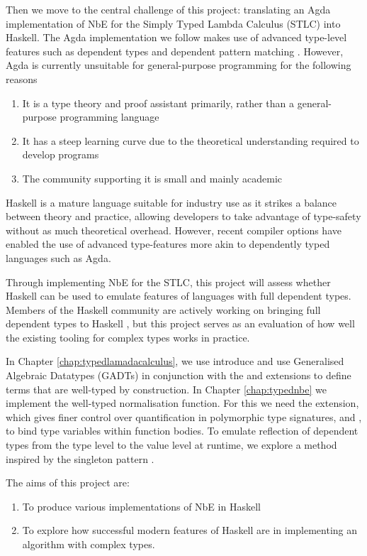 Then we move to the central challenge of this project: translating an Agda implementation of NbE for the Simply Typed Lambda Calculus (STLC) into Haskell. The Agda implementation we follow makes use of advanced type-level features such as dependent types and dependent pattern matching \cite{agdaUserGuide}. However, Agda is currently unsuitable for general-purpose programming for the following reasons

\begin{enumerate}
    \item It is a type theory and proof assistant primarily, rather than a general-purpose programming language
    \item It has a steep learning curve due to the theoretical understanding required to develop programs
    \item The community supporting it is small and mainly academic
\end{enumerate}

Haskell is a mature language suitable for industry use \cite{haskellInIndustry} as it strikes a balance between theory and practice, allowing developers to take advantage of type-safety without as much theoretical overhead. However, recent compiler options have enabled the use of advanced type-features more akin to dependently typed languages such as Agda. 

Through implementing NbE for the STLC, this project will assess whether Haskell can be used to emulate features of languages with full dependent types. Members of the Haskell community are actively working on bringing full dependent types to Haskell \cite{DH}, but this project serves as an evaluation of how well the existing tooling for complex types works in practice.

In Chapter \ref{chap:typedlamadacalculus}, we use introduce and use Generalised Algebraic Datatypes (GADTs) in conjunction with the  and  extensions to define terms that are well-typed by construction. 
In Chapter \ref{chap:typednbe} we implement the well-typed normalisation function. For this we need the  extension, which gives finer control over quantification in polymorphic type signatures, and , to bind type variables within function bodies. To emulate reflection of dependent types from the type level to the value level at runtime, we explore a method inspired by the singleton pattern \cite{singletons}.

The aims of this project are:
\begin{enumerate}
    \item To produce various implementations of NbE in Haskell
    \item To explore how successful modern features of Haskell are in implementing an algorithm with complex types.
\end{enumerate}